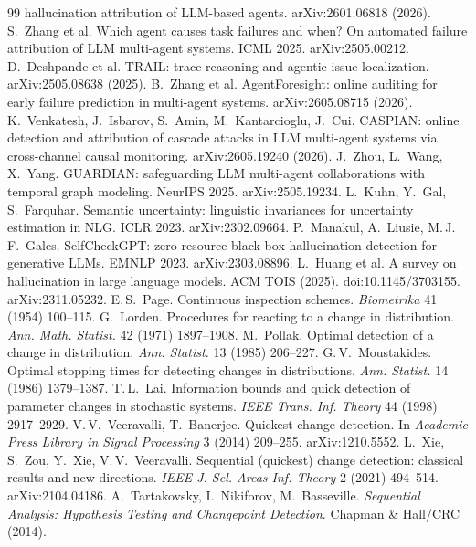 \documentclass[11pt]{article}
\theoremstyle{definition}
\begin{document}
\begin{thebibliography}{99}
hallucination attribution of LLM-based agents. arXiv:2601.06818 (2026).
 S.\ Zhang et al. Which agent causes task failures and when? On automated failure
attribution of LLM multi-agent systems. ICML 2025. arXiv:2505.00212.
 D.\ Deshpande et al. TRAIL: trace reasoning and agentic issue localization.
arXiv:2505.08638 (2025).
 B.\ Zhang et al. AgentForesight: online auditing for early failure prediction
in multi-agent systems. arXiv:2605.08715 (2026).
 K.\ Venkatesh, J.\ Isbarov, S.\ Amin, M.\ Kantarcioglu, J.\ Cui. CASPIAN: online
detection and attribution of cascade attacks in LLM multi-agent systems via cross-channel causal
monitoring. arXiv:2605.19240 (2026).
 J.\ Zhou, L.\ Wang, X.\ Yang. GUARDIAN: safeguarding LLM multi-agent collaborations
with temporal graph modeling. NeurIPS 2025. arXiv:2505.19234.
 L.\ Kuhn, Y.\ Gal, S.\ Farquhar. Semantic uncertainty: linguistic invariances for
uncertainty estimation in NLG. ICLR 2023. arXiv:2302.09664.
 P.\ Manakul, A.\ Liusie, M.\,J.\,F.\ Gales. SelfCheckGPT: zero-resource black-box
hallucination detection for generative LLMs. EMNLP 2023. arXiv:2303.08896.
 L.\ Huang et al. A survey on hallucination in large language models. ACM TOIS
(2025). doi:10.1145/3703155. arXiv:2311.05232.
 E.\,S.\ Page. Continuous inspection schemes. \emph{Biometrika} 41 (1954) 100--115.
 G.\ Lorden. Procedures for reacting to a change in distribution. \emph{Ann. Math.
Statist.} 42 (1971) 1897--1908.
 M.\ Pollak. Optimal detection of a change in distribution. \emph{Ann. Statist.} 13
(1985) 206--227.
 G.\,V.\ Moustakides. Optimal stopping times for detecting changes in
distributions. \emph{Ann. Statist.} 14 (1986) 1379--1387.
 T.\,L.\ Lai. Information bounds and quick detection of parameter changes in stochastic
systems. \emph{IEEE Trans. Inf. Theory} 44 (1998) 2917--2929.
 V.\,V.\ Veeravalli, T.\ Banerjee. Quickest change detection. In \emph{Academic
Press Library in Signal Processing} 3 (2014) 209--255. arXiv:1210.5552.
 L.\ Xie, S.\ Zou, Y.\ Xie, V.\,V.\ Veeravalli. Sequential (quickest) change detection:
classical results and new directions. \emph{IEEE J. Sel. Areas Inf. Theory} 2 (2021) 494--514.
arXiv:2104.04186.
 A.\ Tartakovsky, I.\ Nikiforov, M.\ Basseville. \emph{Sequential Analysis: Hypothesis
Testing and Changepoint Detection}. Chapman \& Hall/CRC (2014).

\end{thebibliography}
\end{document}
